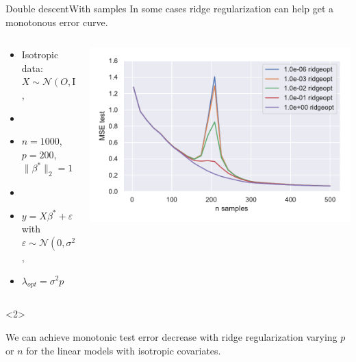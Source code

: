\documentclass[10pt,aspectratio=43]{beamer}
\begin{document}

\begin{frame}{Double descent}{With samples \citep{nakkiran2020optimal}}
    In some cases ridge regularization can help get a monotonous error curve.
    \begin{columns}
        \begin{column}{0.46\textwidth}
            \begin{itemize}
                \item Isotropic data: $X\sim\mathcal{N}(O,\mathrm{Id})$,
                \item[]
                \item $n=1000$, $p=200$, $\|\beta^*\|_2=1$
                \item[]
                \item $y = X\beta^*+\varepsilon$ with $\varepsilon\sim \mathcal{N}(0, \sigma^2\mathrm{Id})$,
                \item $\lambda_{opt} = \sigma^2p$
            \end{itemize}
        \end{column}
        \begin{column}{0.7\textwidth}
            \begin{center}
             \includegraphics[width=1\textwidth]{double_descent.pdf}
             \end{center}
        \end{column}
        \end{columns}
    \begin{onlyenv}<2>
        \begin{block}{}
        We can achieve monotonic test error decrease with ridge regularization varying $p$ or $n$ for the linear models with isotropic covariates.
        \end{block}
    \end{onlyenv}
\end{frame}
\end{document}
